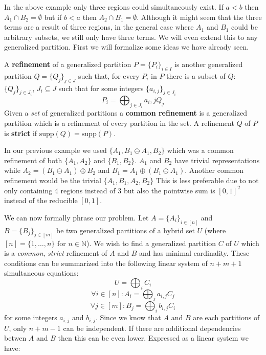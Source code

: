 In the above example only three regions could simultaneously exist.
If $a<b$ then $A_1 \cap B_2 = \emptyset$ but if $b<a$ then $A_2 \cap B_1 = \emptyset$.
Although it might seem that the three terms are a result of three regions, in the general case where 
$A_1$ and $B_1$ could be arbitrary subsets, we still only have three terms.
We will even extend this to any generalized partition.
First we will formalize some ideas we have already seen.


\begin{definition}
	A \textbf{refinement} of a generalized partition $P = \{P_i\}_{i \in I}$ is another generalized partition
	$Q = \{Q_j \}_{j \in J}$ such that, for every $P_i$ in $P$ there is a subset of $Q$: $\{ Q_{j} \}_{j \in J_i}$, 
	$J_i \subseteq J$ such that for some integers $\{a_{i,j}\}_{j \in J_i}$
	\begin{equation}
		P_i = \bigoplus_{j \in J_i} a_i,j Q_{j}
	\end{equation}
	Given a \emph{set} of generalized partitions a \textbf{common refinement} is a generalized partition which is a 
	refinement of every partition in the set. 
	A refinement $Q$ of $P$ is \textbf{strict} if $\text{supp}(Q) = \text{supp}(P)$.
\end{definition}


In our previous example we used $\{ A_1, B_1 \ominus A_1, B_2 \}$ which was a common refinement of both
$\{ A_1, A_2 \}$ and $\{ B_1, B_2 \}$.
$A_1$ and $B_2$ have trivial representations while $A_2 = (B_1 \ominus A_1) \oplus B_2$ and 
$B_1 = A_1 \oplus (B_1 \ominus A_1)$.
Another common refinement would be the trivial $\{ A_1, B_1, A_2, B_2 \}$
This is less preferable due to not only containing 4 regions instead of 3 but also the pointwise sum is $[0,1]^2$
instead of the reducible $[0,1]$.

We can now formally phrase our problem.
Let $A=\{ A_i \}_{i \in [n]}$ and $B=\{ B_j \}_{j \in [m]}$ be two generalized partitions of a hybrid set $U$ 
(where $[n] = \{ 1, \ldots, n \}$ for $n \in \mathbb{N}$).
We wish to find a generalized partition $C$  of $U$ which is a \emph{common}, \emph{strict} refinement of $A$ and $B$
and has minimal cardinality.
These conditions can be summarized into the following linear system of $n+m+1$ simultaneous equations:
\begin{equation}
	U = \bigoplus_i C_i
\end{equation}
\begin{equation}
	\forall i \in [n] : A_i = \bigoplus_j  a_{i,j} C_j
\end{equation}
\begin{equation}
	\forall j \in [m] : B_j = \bigoplus_i b_{i,j} C_i
\end{equation}
for some integers $a_{i,j}$ and $b_{i,j}$.
Since we know that $A$ and $B$ are each partitions of $U$, only $n+m-1$ can be independent.
If there are additional dependencies betwen $A$ and $B$ then this can be even lower.
Expressed as a linear system we have:


